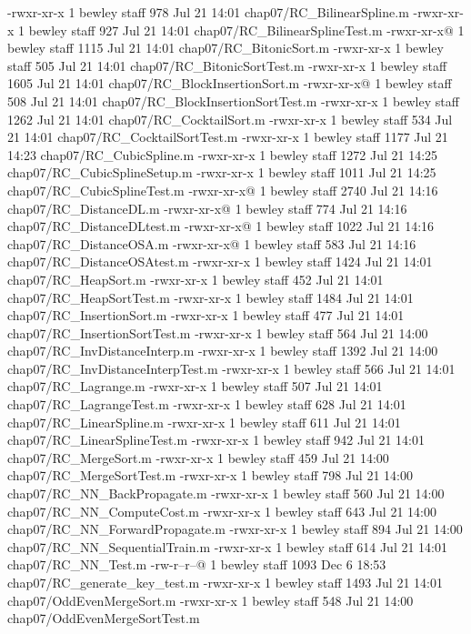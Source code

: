 -rwxr-xr-x  1 bewley  staff    978 Jul 21 14:01 chap07/RC_BilinearSpline.m
-rwxr-xr-x  1 bewley  staff    927 Jul 21 14:01 chap07/RC_BilinearSplineTest.m
-rwxr-xr-x@ 1 bewley  staff   1115 Jul 21 14:01 chap07/RC_BitonicSort.m
-rwxr-xr-x  1 bewley  staff    505 Jul 21 14:01 chap07/RC_BitonicSortTest.m
-rwxr-xr-x  1 bewley  staff   1605 Jul 21 14:01 chap07/RC_BlockInsertionSort.m
-rwxr-xr-x@ 1 bewley  staff    508 Jul 21 14:01 chap07/RC_BlockInsertionSortTest.m
-rwxr-xr-x  1 bewley  staff   1262 Jul 21 14:01 chap07/RC_CocktailSort.m
-rwxr-xr-x  1 bewley  staff    534 Jul 21 14:01 chap07/RC_CocktailSortTest.m
-rwxr-xr-x  1 bewley  staff   1177 Jul 21 14:23 chap07/RC_CubicSpline.m
-rwxr-xr-x  1 bewley  staff   1272 Jul 21 14:25 chap07/RC_CubicSplineSetup.m
-rwxr-xr-x  1 bewley  staff   1011 Jul 21 14:25 chap07/RC_CubicSplineTest.m
-rwxr-xr-x@ 1 bewley  staff   2740 Jul 21 14:16 chap07/RC_DistanceDL.m
-rwxr-xr-x@ 1 bewley  staff    774 Jul 21 14:16 chap07/RC_DistanceDLtest.m
-rwxr-xr-x@ 1 bewley  staff   1022 Jul 21 14:16 chap07/RC_DistanceOSA.m
-rwxr-xr-x@ 1 bewley  staff    583 Jul 21 14:16 chap07/RC_DistanceOSAtest.m
-rwxr-xr-x  1 bewley  staff   1424 Jul 21 14:01 chap07/RC_HeapSort.m
-rwxr-xr-x  1 bewley  staff    452 Jul 21 14:01 chap07/RC_HeapSortTest.m
-rwxr-xr-x  1 bewley  staff   1484 Jul 21 14:01 chap07/RC_InsertionSort.m
-rwxr-xr-x  1 bewley  staff    477 Jul 21 14:01 chap07/RC_InsertionSortTest.m
-rwxr-xr-x  1 bewley  staff    564 Jul 21 14:00 chap07/RC_InvDistanceInterp.m
-rwxr-xr-x  1 bewley  staff   1392 Jul 21 14:00 chap07/RC_InvDistanceInterpTest.m
-rwxr-xr-x  1 bewley  staff    566 Jul 21 14:01 chap07/RC_Lagrange.m
-rwxr-xr-x  1 bewley  staff    507 Jul 21 14:01 chap07/RC_LagrangeTest.m
-rwxr-xr-x  1 bewley  staff    628 Jul 21 14:01 chap07/RC_LinearSpline.m
-rwxr-xr-x  1 bewley  staff    611 Jul 21 14:01 chap07/RC_LinearSplineTest.m
-rwxr-xr-x  1 bewley  staff    942 Jul 21 14:01 chap07/RC_MergeSort.m
-rwxr-xr-x  1 bewley  staff    459 Jul 21 14:00 chap07/RC_MergeSortTest.m
-rwxr-xr-x  1 bewley  staff    798 Jul 21 14:00 chap07/RC_NN_BackPropagate.m
-rwxr-xr-x  1 bewley  staff    560 Jul 21 14:00 chap07/RC_NN_ComputeCost.m
-rwxr-xr-x  1 bewley  staff    643 Jul 21 14:00 chap07/RC_NN_ForwardPropagate.m
-rwxr-xr-x  1 bewley  staff    894 Jul 21 14:00 chap07/RC_NN_SequentialTrain.m
-rwxr-xr-x  1 bewley  staff    614 Jul 21 14:01 chap07/RC_NN_Test.m
-rw-r--r--@ 1 bewley  staff   1093 Dec  6 18:53 chap07/RC_generate_key_test.m
-rwxr-xr-x  1 bewley  staff   1493 Jul 21 14:01 chap07/OddEvenMergeSort.m
-rwxr-xr-x  1 bewley  staff    548 Jul 21 14:00 chap07/OddEvenMergeSortTest.m
